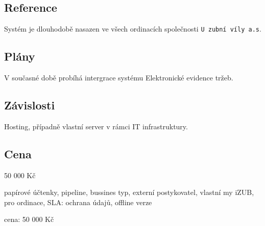 \documentclass[12pt, a4paper, titlepage]{article}
\begin{document}
	\subsection*{Reference}
	Systém je dlouhodobě nasazen ve všech ordinacích společnosti \texttt{U zubní víly a.s}.

	\subsection*{Plány}
	V současné době probíhá intergrace systému Elektronické evidence tržeb.

	\subsection*{Závislosti}
	Hosting, případně vlastní server v rámci IT infrastruktury.

	\subsection*{Cena}
	50 000 Kč

	papírové účtenky, pipeline, bussines typ, externí postykovatel, vlastní my iZUB, pro ordinace,
	SLA:
		ochrana údajů, offline verze

	cena:
		50 000 Kč
\end{document}
